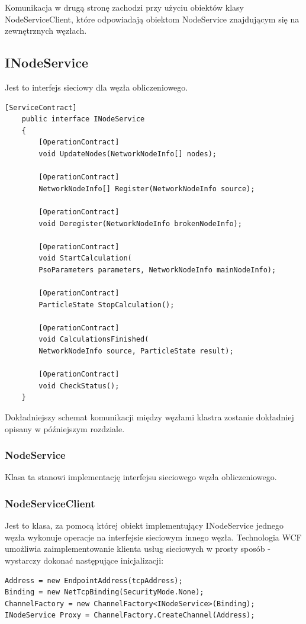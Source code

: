 \documentclass[12pt, twoside, openany, abstract=on]{report}
\theoremstyle{definition}
\begin{document}
Komunikacja w drugą stronę zachodzi przy użyciu obiektów klasy NodeServiceClient, które odpowiadają obiektom NodeService znajdującym się na zewnętrznych węzłach.

\subsection{INodeService}
Jest to interfejs sieciowy dla węzła obliczeniowego.

\begin{lstlisting}[frame=single]
 [ServiceContract]
    public interface INodeService
    {
        [OperationContract] 
        void UpdateNodes(NetworkNodeInfo[] nodes);

        [OperationContract]
        NetworkNodeInfo[] Register(NetworkNodeInfo source);

        [OperationContract]
        void Deregister(NetworkNodeInfo brokenNodeInfo);

        [OperationContract]
        void StartCalculation(
        PsoParameters parameters, NetworkNodeInfo mainNodeInfo);

        [OperationContract]
        ParticleState StopCalculation();

        [OperationContract]
        void CalculationsFinished(
        NetworkNodeInfo source, ParticleState result);

        [OperationContract]
        void CheckStatus();
    }
\end{lstlisting}

Dokładniejszy schemat komunikacji między węzłami klastra zostanie dokładniej opisany w późniejszym rozdziale.

\subsubsection{NodeService}
Klasa ta stanowi implementację interfejsu sieciowego węzła obliczeniowego.

\subsubsection{NodeServiceClient}
Jest to klasa, za pomocą której obiekt implementujący INodeService jednego węzła wykonuje operacje na interfejsie sieciowym innego węzła. Technologia WCF umożliwia zaimplementowanie klienta usług sieciowych w prosty sposób - wystarczy dokonać następujące inicjalizacji:

\begin{lstlisting}[frame=single]
Address = new EndpointAddress(tcpAddress);
Binding = new NetTcpBinding(SecurityMode.None);
ChannelFactory = new ChannelFactory<INodeService>(Binding);
INodeService Proxy = ChannelFactory.CreateChannel(Address);
\end{lstlisting}             
\end{document}
